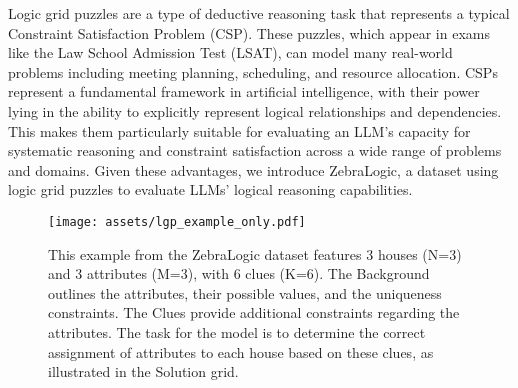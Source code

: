 Logic grid puzzles are a type of deductive reasoning task that represents a typical Constraint Satisfaction Problem (CSP). These puzzles, which appear in exams like the Law School Admission Test (LSAT), can model many real-world problems including meeting planning, scheduling, and resource allocation. CSPs represent a fundamental framework in artificial intelligence, with their power lying in the ability to explicitly represent logical relationships and dependencies. This makes them particularly suitable for evaluating an LLM's capacity for systematic reasoning and constraint satisfaction across a wide range of problems and domains. Given these advantages, we introduce ZebraLogic, a dataset using logic grid puzzles to evaluate LLMs' logical reasoning capabilities.



\begin{figure}[t]
    \centering
    \texttt{[image: assets/lgp\_example\_only.pdf]}
    \vspace{-1mm}
    \caption{
    \small This example from the ZebraLogic dataset features 3 houses (N=3) and 3 attributes (M=3), with 6 clues (K=6). The Background outlines the attributes, their possible values, and the uniqueness constraints. The Clues provide additional constraints regarding the attributes. The task for the model is to determine the correct assignment of attributes to each house based on these clues, as illustrated in the Solution grid.
    }
    \label{fig:lgp_example}
\end{figure}



